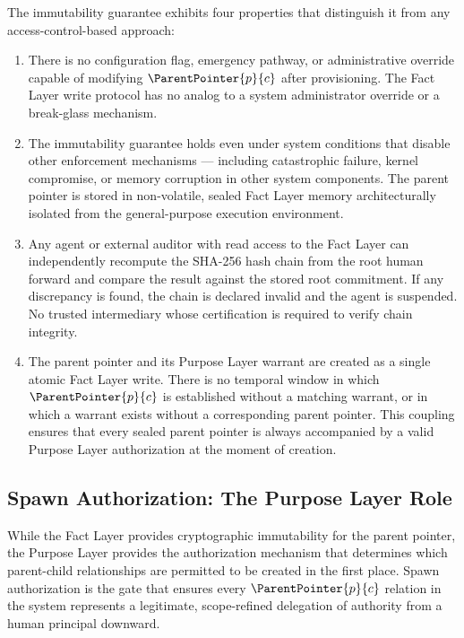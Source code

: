 The immutability guarantee exhibits four properties that distinguish it from any access-control-based approach:

\begin{enumerate}
    \item[(E1) \textbf{No override path.}] There is no configuration flag, emergency pathway, or administrative override capable of modifying $\ParentPointer{p}{c}$ after provisioning. The Fact Layer write protocol has no analog to a system administrator override or a break-glass mechanism.

    \item[(E2) \textbf{Failure-state resilience.}] The immutability guarantee holds even under system conditions that disable other enforcement mechanisms --- including catastrophic failure, kernel compromise, or memory corruption in other system components. The parent pointer is stored in non-volatile, sealed Fact Layer memory architecturally isolated from the general-purpose execution environment.

    \item[(E3) \textbf{Verification independence.}] Any agent or external auditor with read access to the Fact Layer can independently recompute the SHA-256 hash chain from the root human forward and compare the result against the stored root commitment. If any discrepancy is found, the chain is declared invalid and the agent is suspended. No trusted intermediary whose certification is required to verify chain integrity.

    \item[(E4) \textbf{Atomic warrant-pointer coupling.}] The parent pointer and its Purpose Layer warrant are created as a single atomic Fact Layer write. There is no temporal window in which $\ParentPointer{p}{c}$ is established without a matching warrant, or in which a warrant exists without a corresponding parent pointer. This coupling ensures that every sealed parent pointer is always accompanied by a valid Purpose Layer authorization at the moment of creation.
\end{enumerate}

\subsection{Spawn Authorization: The Purpose Layer Role}
\label{sec:purpose_layer_spawn_auth}

While the Fact Layer provides cryptographic immutability for the parent pointer, the Purpose Layer provides the authorization mechanism that determines which parent-child relationships are permitted to be created in the first place. Spawn authorization is the gate that ensures every $\ParentPointer{p}{c}$ relation in the system represents a legitimate, scope-refined delegation of authority from a human principal downward.

